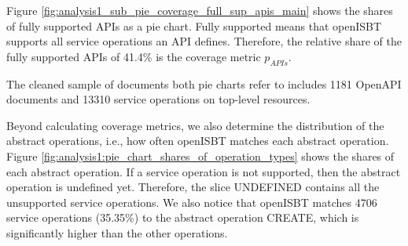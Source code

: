 Figure \ref{fig:analysis1_sub_pie_coverage_full_sup_apis_main} shows the shares of fully supported APIs as a pie chart. 
Fully supported means that openISBT supports all service operations an API defines.
Therefore, the relative share of the fully supported APIs of 41.4\% is the coverage metric $p_{APIs}$.

The cleaned sample of documents both pie charts refer to includes 1181 OpenAPI documents and 13310 service operations on top-level resources. 

Beyond calculating coverage metrics, we also determine the distribution of the abstract operations, i.e.,  how often openISBT matches each abstract operation. Figure \ref{fig:analysis1:pie_chart_shares_of_operation_types} shows the shares of each abstract operation. 
If a service operation is not supported, then the abstract operation is undefined yet. 
Therefore, the slice UNDEFINED contains all the unsupported service operations.
We also notice that openISBT matches 4706 service operations (35.35\%) to the abstract operation CREATE, which is significantly higher than the other operations. 


